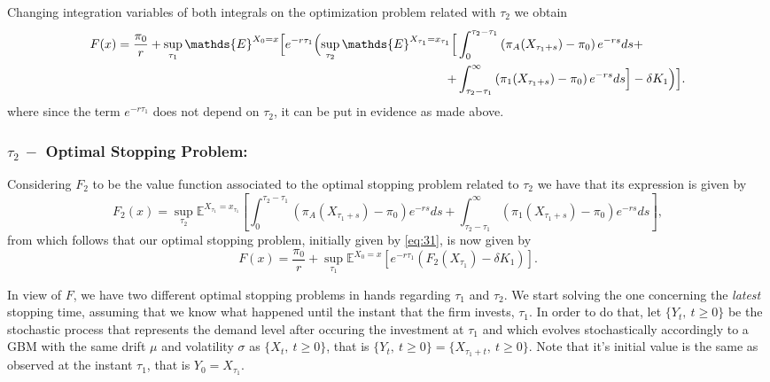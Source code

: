 Changing integration variables of both integrals on the optimization problem related with $\tau_2$ we obtain
\begin{equation}
	\begin{split}
		F(x)=\frac{\pi_0}{r}+\sup _{\tau_1} \mathds{E}^{X_0=x} \Bigl[ e^{-r \tau_1} \Bigl(  \sup_{\tau_2} \mathds{E}^{X_{\tau_1}=x_{\tau_1}} \Bigl[ &\int_0^{\tau_2-\tau_1} \left( \pi_A(X_{\tau_1+s})-\pi_0 \right) e^{-rs}ds +\\
		+&\int_{\tau_2-\tau_1}^\infty \left( \pi_1(X_{\tau_1+s})-\pi_0 \right) e^{-rs}ds  \Bigr]-\delta K_1 \Bigr) \Bigr].
	\end{split}
	\label{eq:3w}
\end{equation}
where since the term $e^{-r \tau_1}$ does not depend on $\tau_2$, it can be put in evidence as made above.


\subsubsection{$\tau_2 \ - $ Optimal Stopping Problem:}

Considering $F_2$ to be the value function associated to the optimal stopping problem related to $\tau_2$ we have that its expression is given by
\begin{equation}
F_2(x)=\sup_{\tau_2} \mathds{E}^{X_{\tau_1}=x_{\tau_1}} \left[ \int_0^{\tau_2-\tau_1} \left( \pi_A(X_{\tau_1+s})-\pi_0 \right) e^{-rs}ds + \int_{\tau_2-\tau_1}^\infty \left( \pi_1(X_{\tau_1+s})-\pi_0 \right) e^{-rs}ds  \right],
\label{eq:34}
\end{equation}
from which follows that our optimal stopping problem, initially given by \eqref{eq:31}, is now given by
\begin{equation}
F(x)=\frac{\pi_0}{r}+\sup _{\tau_1} \mathds{E}^{X_0=x} \left[ e^{-r \tau_1}(F_2(X_{\tau_1})-\delta K_1 )\right].
\label{eq:35}
\end{equation}

In view of $F$, we have two different optimal stopping problems in hands regarding $\tau_1$ and $\tau_2$. We start solving the one concerning the \textit{latest} stopping time, assuming that we know what happened until the
instant that the firm invests, $\tau_1$. In order to do that, let $\{Y_t, \ t\geq0\}$ be the stochastic process that represents the demand level after occuring the investment at $\tau_1$ and which evolves stochastically accordingly to a GBM with the same drift $\mu$ and volatility $\sigma$ as $\{X_t, \ t\geq0\}$, that is $\{Y_t, \ t\geq0\} = \{X_{\tau_1+t}, \ t\geq0\}$. Note that it's initial value is the same as observed at the instant $\tau_1$, that is $Y_0=X_{\tau_1}$.

